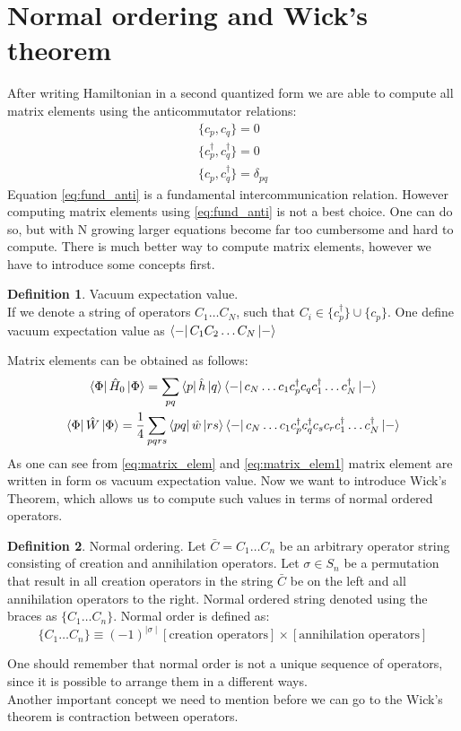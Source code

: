 \documentclass[twoside,english]{uiofysmaster}
\theoremstyle{definition}
\newtheorem{defn}{Definition}
\begin{document}
\section{Normal ordering and Wick's theorem} \label{sec:Wick}
After writing Hamiltonian in a second quantized form we are able to compute all matrix elements using the  anticommutator relations:
\begin{gather}
\{c_p,c_q \}=0\\
\{c_p^\dagger,c_q^\dagger \}=0\\
\{c_p,c_q^\dagger\} = \delta_{pq} \label{eq:fund_anti}
\end{gather}
Equation \ref{eq:fund_anti} is a fundamental intercommunication relation.
However computing matrix elements using \ref{eq:fund_anti} is not a best choice. One can do so, but with N growing larger equations become far too cumbersome and hard to compute. There is much better way to compute matrix elements, however  we have to introduce some concepts first.
\begin{defn}
Vacuum expectation value. \\
If we denote a string of operators $C_1 \dots C_N$, such that $C_i \in \{c_p^\dagger\} \cup \{c_p\} $. One define vacuum expectation value as $ \bra{-}C_1C_2 \dots C_N \ket{-}	$
\end{defn}
Matrix elements can be obtained as follows:
\begin{gather} \label{eq:matrix_elem}
\bra{\Phi}\hat{H}_0\ket{\Phi}=\sum_{pq}\bra{p}\hat{h}\ket{q}\bra{-}c_N \dots c_1 c_p^\dagger c_q c_1^\dagger \dots c_N^\dagger \ket{-}\\
\bra{\Phi}\hat{W}\ket{\Phi}= \frac{1}{4}\sum_{pqrs} \bra{pq}\hat{w}\ket{rs} \bra{-}c_N \dots c_1 c_p^\dagger c_q^\dagger c_s c_r c_1^\dagger \dots c_N^\dagger \ket{-} \label{eq:matrix_elem1}
\end{gather} 
As one can see from \ref{eq:matrix_elem} and \ref{eq:matrix_elem1}  matrix element are written in form os vacuum expectation value. Now we want to introduce Wick's Theorem, which allows us to compute such values in terms of normal ordered operators. 
\begin{defn} Normal ordering.
	Let $\bar{C}=C_1 \dots C_n$ be an arbitrary operator string consisting of creation and annihilation operators. 
	Let $\sigma \in S_n$ be a permutation that result in all creation operators in the string $\bar{C}$ be on the left and all annihilation operators to the right. Normal ordered string denoted using the braces as $\{C_1 \dots C_n \}$. Normal order is defined as:
\begin{equation}
	\{C_1 \dots C_n \} \equiv (-1)^{\mid \sigma \mid}[\text{creation operators} ] \times [ \text{annihilation operators}]
\end{equation}
\end{defn}
One should remember that normal order is not a unique sequence of operators, since it is possible to arrange them in a different ways.\\
Another important concept we need to mention before we can go to the Wick's theorem is contraction between operators.
\end{document}
